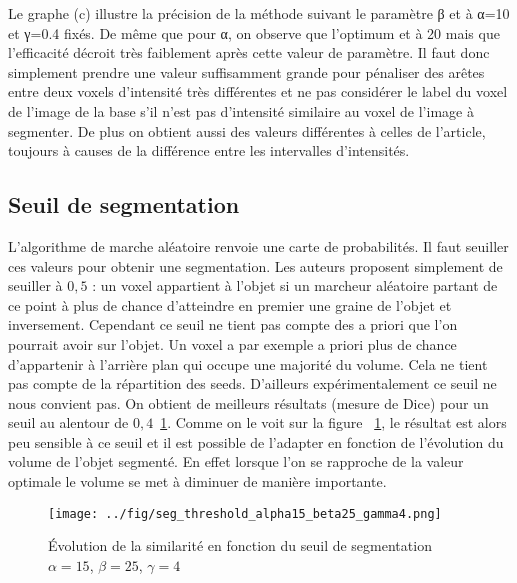 \documentclass{article}
\begin{document}
Le graphe (c) illustre la précision de la méthode suivant le paramètre β et à α=10 et γ=0.4 fixés. De même que pour α, on observe que l’optimum et à 20 mais que l’efficacité décroit très faiblement après cette valeur de paramètre. Il faut donc simplement prendre une valeur suffisamment grande pour pénaliser des arêtes entre deux voxels d’intensité très différentes et ne pas considérer le label du voxel de l’image de la base s’il n’est pas d’intensité similaire au voxel de l’image à segmenter. De plus on obtient aussi des valeurs différentes à celles de l’article, toujours à causes de la différence entre les intervalles d’intensités.




\subsection{Seuil de segmentation}

L'algorithme de marche aléatoire renvoie une carte de probabilités. Il faut seuiller ces valeurs pour obtenir une segmentation. Les auteurs proposent simplement de seuiller à $0,5$ : un voxel appartient à l'objet si un marcheur aléatoire partant de ce point à plus de chance d'atteindre en premier une graine de l'objet et inversement. Cependant ce seuil ne tient pas compte des a priori que l'on pourrait avoir sur l'objet. Un voxel a par exemple a priori plus de chance d'appartenir à l'arrière plan qui occupe une majorité du volume. Cela ne tient pas compte de la répartition des seeds. D'ailleurs expérimentalement ce seuil ne nous convient pas. On obtient de meilleurs résultats (mesure de Dice) pour un seuil au alentour de $0,4$~\ref{fig:seg_threshold}. Comme on le voit sur la figure ~\ref{fig:seg_threshold}, le résultat est alors peu sensible à ce seuil et il est possible de l'adapter en fonction de l'évolution du volume de l'objet segmenté. En effet lorsque l'on se rapproche de la valeur optimale le volume se met à diminuer de manière importante.
\begin{center}
\begin{figure}[h]
\label{fig:seg_threshold}
 \caption{Évolution de la similarité en fonction du seuil de segmentation $\alpha=15$, $\beta=25$, $\gamma=4$}
\texttt{[image: ../fig/seg\_threshold\_alpha15\_beta25\_gamma4.png]}
\end{figure}
\end{center}
\end{document}
